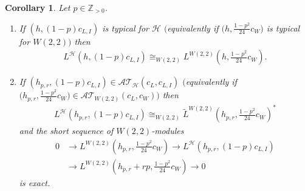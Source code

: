 \documentclass[11pt]{article}
\numberwithin{equation}{section}
\newtheorem{Corollary}[Theorem]{Corollary}
\newcommand{\N}{{\mathbb Z}_{> 0} }
\newcommand{\HVir}{\mathcal H}
\begin{document}
\begin{Corollary}\label{L za -}Let $p \in \N $.
\begin{enumerate}\itemsep=0pt
\item[$(i)$] If $(h,(1-p) c_{L,I})$ is typical for $\HVir$ $($equivalently if $\big( h,\frac{1-p^{2}}{24}c_{W}\big) $ is typical for $W(2,2))$ then
\begin{gather*}
L^{\HVir} ( h,(1-p) c_{L,I} ) \cong_{W(2,2) }L^{W(2,2)}\left( h,\frac{1-p^{2}}{24}c_{W}\right) .
\end{gather*}

\item[$(ii)$] If $(h_{p,r},(1-p) c_{L,I}) \in {\mathcal {AT} }_{\HVir} ( c_L, c_{L,I} )$ $($equivalently if $ \big(h_{p,r},\frac{1-p^{2}}{24}c_{W}\big) \in {\mathcal {AT} }_{W(2,2)} ( c_L, c_W ) )$ then
\begin{gather*}
L^{\HVir} ( h_{p,r},(1-p) c_{L,I} ) \cong_{W(2,2) }\widetilde{L}^{W(2,2)}\left( h_{p,r},\frac{1-p^{2}}{24}c_{W}\right) ^{\ast}
\end{gather*}
and the short sequence of $W(2,2)$-modules
\begin{align*}
0 & \rightarrow L^{W(2,2)}\left( h_{p,r},\frac{1-p^{2}}{24}c_{W}\right)
\rightarrow L^{\HVir}\left( h_{p,r},(1-p) c_{L,I}\right) \\ %
& \rightarrow L^{W(2,2)}\left( h_{p,r}+rp,\frac{1-p^{2}}{24}c_{W}\right)
\rightarrow0 \nonumber
\end{align*}
is exact.
\end{enumerate}
\end{Corollary}
\setcounter{section}{3}
\setcounter{subsection}{0}
\setcounter{subsubsection}{0}
\setcounter{Theorem}{8}
\setcounter{equation}{6}
\end{document}

